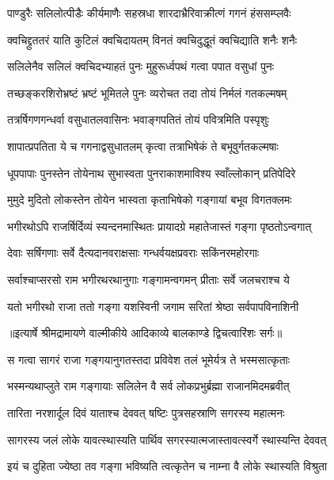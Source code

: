 \twolineshloka
{पाण्डुरैः सलिलोत्पीडैः कीर्यमाणैः सहस्रधा}
{शारदाभ्रैरिवाक्रीत्णं गगनं हंससम्प्लवैः} %

\twolineshloka
{क्वचिद्द्रुततरं याति कुटिलं क्वचिदायतम्}
{विनतं क्वचिदुद्धूतं क्वचिद्याति शनैः शनैः} %

\twolineshloka
{सलिलेनैव सलिलं क्वचिदभ्याहतं पुनः}
{मुहुरूर्ध्वपथं गत्वा पपात वसुधां पुनः} %

\twolineshloka
{तच्छङ्करशिरोभ्रष्टं भ्रष्टं भूमितले पुनः}
{व्यरोचत तदा तोयं निर्मलं गतकल्मषम्} %

\twolineshloka
{तत्रर्षिगणगन्धर्वा वसुधातलवासिनः}
{भवाङ्गपतितं तोयं पवित्रमिति पस्पृशुः} %

\twolineshloka
{शापात्प्रपतिता ये च गगनाद्वसुधातलम्}
{कृत्वा तत्राभिषेकं ते बभूवुर्गतकल्मषाः} %

\twolineshloka
{धूपपापाः पुनस्तेन तोयेनाथ सुभास्वता}
{पुनराकाशमाविश्य स्वाँल्लोकान् प्रतिपेदिरे} %

\twolineshloka
{मुमुदे मुदितो लोकस्तेन तोयेन भास्वता}
{कृताभिषेको गङ्गायां बभूव विगतक्लमः} %

\twolineshloka
{भगीरथोऽपि राजर्षिर्दिव्यं स्यन्दनमास्थितः}
{प्रायादग्रे महातेजास्तं गङ्गा पृष्ठतोऽन्वगात्} %

\twolineshloka
{देवाः सर्षिगणाः सर्वे दैत्यदानवराक्षसाः}
{गन्धर्वयक्षप्रवराः सकिंनरमहोरगाः} %

\twolineshloka
{सर्वाश्चाप्सरसो राम भगीरथरथानुगाः}
{गङ्गामन्वगमन् प्रीताः सर्वे जलचराश्च ये} %

\twolineshloka
{यतो भगीरथो राजा ततो गङ्गा यशस्विनी}
{जगाम सरितां श्रेष्ठा सर्वपापविनाशिनी} %


{॥इत्यार्षे श्रीमद्रामायणे वाल्मीकीये आदिकाव्ये बालकाण्डे द्विचत्वारिंशः सर्गः॥}


\twolineshloka
{स गत्वा सागरं राजा गङ्गयानुगतस्तदा}
{प्रविवेश तलं भूमेर्यत्र ते भस्मसात्कृताः} %

\twolineshloka
{भस्मन्यथाप्लुते राम गङ्गायाः सलिलेन वै}
{सर्व लोकप्रभुर्ब्रह्मा राजानमिदमब्रवीत्} %

\twolineshloka
{तारिता नरशार्दूल दिवं याताश्च देववत्}
{षष्टिः पुत्रसहस्राणि सगरस्य महात्मनः} %

\twolineshloka
{सागरस्य जलं लोके यावत्स्थास्यति पार्थिव}
{सगरस्यात्मजास्तावत्स्वर्गे स्थास्यन्ति देववत्} %

\twolineshloka
{इयं च दुहिता ज्येष्ठा तव गङ्गा भविष्यति}
{त्वत्कृतेन च नाम्ना वै लोके स्थास्यति विश्रुता} %

